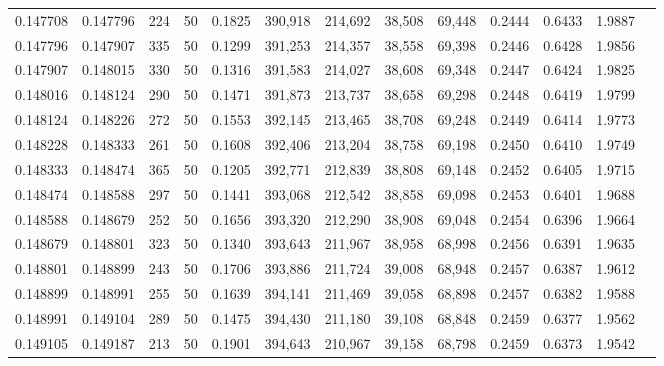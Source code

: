 \begin{tabular}{rrrrrrrrrrrrr}
0.147708 & 0.147796 &   224 &  50 &                                     0.1825 & 390,918 & 214,692 &  38,508 &  69,448 & 0.2444 & 0.6433 & 1.9887 \\
0.147796 & 0.147907 &   335 &  50 &                                     0.1299 & 391,253 & 214,357 &  38,558 &  69,398 & 0.2446 & 0.6428 & 1.9856 \\
0.147907 & 0.148015 &   330 &  50 &                                     0.1316 & 391,583 & 214,027 &  38,608 &  69,348 & 0.2447 & 0.6424 & 1.9825 \\
0.148016 & 0.148124 &   290 &  50 &                                     0.1471 & 391,873 & 213,737 &  38,658 &  69,298 & 0.2448 & 0.6419 & 1.9799 \\
0.148124 & 0.148226 &   272 &  50 &                                     0.1553 & 392,145 & 213,465 &  38,708 &  69,248 & 0.2449 & 0.6414 & 1.9773 \\
0.148228 & 0.148333 &   261 &  50 &                                     0.1608 & 392,406 & 213,204 &  38,758 &  69,198 & 0.2450 & 0.6410 & 1.9749 \\
0.148333 & 0.148474 &   365 &  50 &                                     0.1205 & 392,771 & 212,839 &  38,808 &  69,148 & 0.2452 & 0.6405 & 1.9715 \\
0.148474 & 0.148588 &   297 &  50 &                                     0.1441 & 393,068 & 212,542 &  38,858 &  69,098 & 0.2453 & 0.6401 & 1.9688 \\
0.148588 & 0.148679 &   252 &  50 &                                     0.1656 & 393,320 & 212,290 &  38,908 &  69,048 & 0.2454 & 0.6396 & 1.9664 \\
0.148679 & 0.148801 &   323 &  50 &                                     0.1340 & 393,643 & 211,967 &  38,958 &  68,998 & 0.2456 & 0.6391 & 1.9635 \\
0.148801 & 0.148899 &   243 &  50 &                                     0.1706 & 393,886 & 211,724 &  39,008 &  68,948 & 0.2457 & 0.6387 & 1.9612 \\
0.148899 & 0.148991 &   255 &  50 &                                     0.1639 & 394,141 & 211,469 &  39,058 &  68,898 & 0.2457 & 0.6382 & 1.9588 \\
0.148991 & 0.149104 &   289 &  50 &                                     0.1475 & 394,430 & 211,180 &  39,108 &  68,848 & 0.2459 & 0.6377 & 1.9562 \\
0.149105 & 0.149187 &   213 &  50 &                                     0.1901 & 394,643 & 210,967 &  39,158 &  68,798 & 0.2459 & 0.6373 & 1.9542 \\

\end{tabular}
